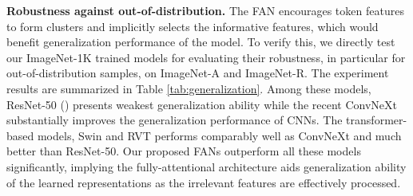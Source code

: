 \documentclass[nohyperref]{article}
\theoremstyle{plain}
\theoremstyle{definition}
\theoremstyle{remark}
\begin{document}
\begin{table}[h]
    \small
    \caption{\textbf{Main results on object detection.} FAN shows stronger clean accuracy and robustness than other models. `' denotes the accuracy pretrained on ImageNet-22K.}
    \label{tab:robustness_coco_c}
    \vspace{1mm}
    \centering
    \setlength{\tabcolsep}{4pt}
\vspace{-4mm}
\end{table}


\textbf{Robustness against out-of-distribution.} The FAN encourages token features to form clusters and implicitly selects the informative features, which would benefit   generalization performance of the model. To verify this, we directly test our ImageNet-1K trained models for evaluating their robustness, in particular for  out-of-distribution samples,  on ImageNet-A and ImageNet-R. The experiment results are summarized in Table \ref{tab:generalization}. Among these models, ResNet-50 (\citeauthor{liu2021swin}) presents weakest generalization ability while the recent ConvNeXt substantially improves the generalization performance of CNNs. The transformer-based models, Swin and RVT performs comparably well as ConvNeXt and much better than ResNet-50. Our proposed FANs outperform  all these models significantly, implying the fully-attentional architecture aids generalization ability of the learned representations as the irrelevant features are effectively processed.
\end{document}
